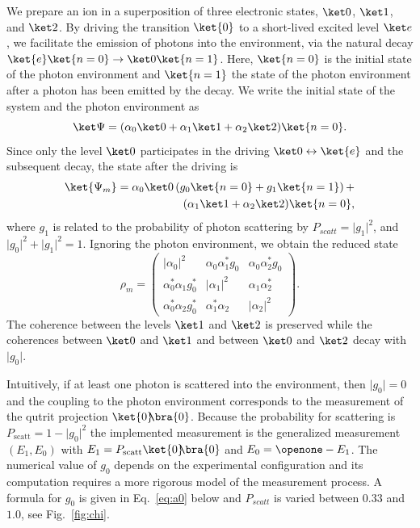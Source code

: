 \documentclass[12pt,
onecolumn,
superscriptaddress,
floatfix,
]{revtex4-2}
\newcommand{\abs}[1]{{\lvert{#1}\rvert}}
\newcommand{\ketbra}[2]{{\ket{#1}\!\!\bra{#2}}}
\newcommand{\proj}[1]{{\ketbra{#1}{#1}}}
\begin{document}
We prepare an ion in a superposition of three electronic states, 
 $\ket0$, $\ket1$, and $\ket2$.
By driving the transition $\ket{0}$ to a short-lived 
 excited level $\ket e$, we facilitate the emission of photons into the 
 environment, via the natural decay $\ket{e}\ket{n=0}\rightarrow \ket 
 0\ket{n=1}$.
Here, $\ket{n=0}$ is the initial state of the photon environment and 
 $\ket{n=1}$ the state of the photon environment after a photon 
 has been emitted by the decay.
We write the initial state of the system and the photon environment as
%
\begin{equation}
 \ket\Psi= (\alpha_0\ket0+ \alpha_1\ket1+ \alpha_2\ket2) \ket{n=0}.
\end{equation}
%
Since only the level $\ket0$ participates in the driving $\ket0\leftrightarrow 
 \ket{e}$ and the subsequent decay, the state after the driving is
%
\begin{equation}\begin{split}
 \ket{\Psi_m}= \alpha_0\ket0 \left( g_0\ket{n=0} + g_1 
 \ket{n=1}\right)+ \\
 (\alpha_1\ket1+ \alpha_2\ket2) \ket{n=0},
\end{split}\end{equation}
%
where $g_1$ is related to the probability of photon scattering by $P_{scatt} = \abs{g_1}^2$, and $\abs{g_0}^2 + \abs{g_1}^2 = 1$. 
Ignoring the photon environment, we obtain the reduced state
%
\begin{equation}
 \rho_m=
 \begin{pmatrix}
  \abs{\alpha_0}^2 & \alpha_0 \alpha_1^* g_0 & \alpha_0 \alpha_2^* g_0 \\
  \alpha_0^* \alpha_1 g_0^* & \abs{\alpha_1}^2 & \alpha_1 \alpha_2^* \\
  \alpha_0^*\alpha_2 g_0^* & \alpha_1^* \alpha_2 & \abs{\alpha_2}^2
 \end{pmatrix}.
\end{equation}
%
The coherence between the levels $\ket1$ and $\ket2$ is preserved while the 
 coherences between $\ket0$ and $\ket1$ and between $\ket0$ and $\ket2$ decay with 
 $\abs{g_0}$.

Intuitively, if at least one photon is scattered into the environment, then 
 $\abs{g_0}= 0$ and the coupling to the photon environment corresponds to the measurement 
 of the qutrit projection $\proj 0$.
Because the probability for scattering is $P_\mathrm{scatt}= 1-\abs{g_0}^2$ 
 the implemented measurement is the generalized measurement $(E_1,E_0)$ with 
 $E_1= P_\mathrm{scatt} \proj0$ and $E_0= \openone-E_1$.
The numerical value of $g_0$ depends on the experimental configuration and its 
 computation requires a more rigorous model of the measurement process.
A formula for $g_0$ is given in Eq.~\eqref{eq:a0} below and 
 $P_{scatt}$ is varied between $0.33$ and $1.0$, see Fig.~\ref{fig:chi}.
\end{document}

